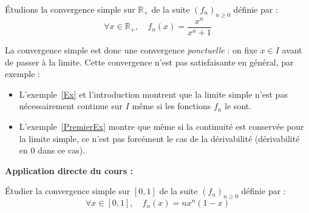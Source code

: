 \documentclass[french,11pt,twoside]{VcCours}
\newenvironment{ApplicationDirecte}{\textbf{Application directe du cours :}

}{}
\begin{document}
\begin{Exemple}[\label{Ex}] Étudions la convergence simple  sur $\mathbb{R}_+$ de la suite $(f_n)_{n \geq 0}$ définie par :
$$ \forall x \in \mathbb{R}_+, \quad f_n(x) = \frac{x^n}{x^n+1}$$

%
%
%
%

\vspace*{8cm}

\end{Exemple}

\begin{Remarque}{} La convergence simple est donc une convergence \emph{ponctuelle} : on fixe $x \in I$ avant de passer à la limite. Cette convergence n'est pas satisfaisante en général, par exemple :

\begin{itemize}
\item L'exemple~\ref{Ex} et l'introduction montrent que la limite simple n'est pas nécessairement continue sur $I$ même si les fonctions $f_n$ le sont.
\item L'exemple~\ref{PremierEx} montre que même si la continuité est conservée pour la limite simple, ce n'est pas forcément le cas de la dérivabilité (dérivabilité en $0$ dans ce cas).
\end{itemize}
\end{Remarque}

\begin{ApplicationDirecte} Étudier la convergence simple sur $[0,1]$ de la suite $(f_n)_{n \geq 0}$ définie par :
$$ \forall x \in [0,1], \quad f_n(x) = n x^n(1-x)$$
\end{ApplicationDirecte}
\end{document}
